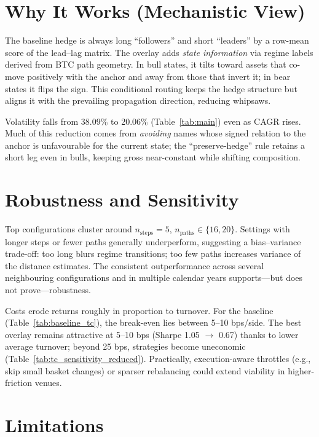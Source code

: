 \section{Why It Works (Mechanistic View)}\label{sec:disc:mechanism}


The baseline hedge is always long “followers” and short “leaders” by a row-mean score of the lead–lag matrix. The overlay adds \emph{state information} via regime labels derived from BTC path geometry. In bull states, it tilts toward assets that co-move positively with the anchor and away from those that invert it; in bear states it flips the sign. This conditional routing keeps the hedge structure but aligns it with the prevailing propagation direction, reducing whipsaws.

Volatility falls from 38.09\% to 20.06\% (Table~\ref{tab:main}) even as CAGR rises. Much of this reduction comes from \emph{avoiding} names whose signed relation to the anchor is unfavourable for the current state; the “preserve-hedge” rule retains a short leg even in bulls, keeping gross near-constant while shifting composition.

\section{Robustness and Sensitivity}\label{sec:disc:robust}

Top configurations cluster around \(n_{\text{steps}}{=}5\), \(n_{\text{paths}}\in\{16,20\}\). Settings with longer steps or fewer paths generally underperform, suggesting a bias–variance trade-off: too long blurs regime transitions; too few paths increases variance of the distance estimates. The consistent outperformance across several neighbouring configurations and in multiple calendar years supports—but does not prove—robustness.


Costs erode returns roughly in proportion to turnover. For the baseline (Table~\ref{tab:baseline_tc}), the break-even lies between 5–10 bps/side. The best overlay remains attractive at 5–10 bps (Sharpe 1.05 $\to$ 0.67) thanks to lower average turnover; beyond 25 bps, strategies become uneconomic (Table~\ref{tab:tc_sensitivity_reduced}). Practically, execution-aware throttles (e.g., skip small basket changes) or sparser rebalancing could extend viability in higher-friction venues.

\section{Limitations}\label{sec:disc:limits}

